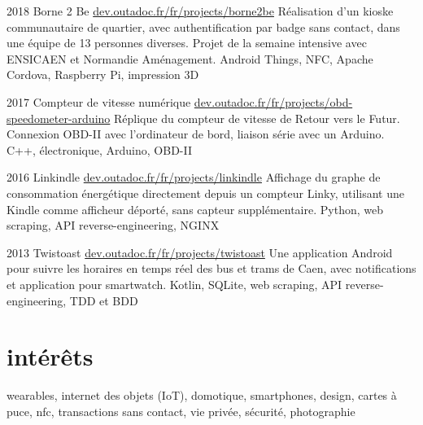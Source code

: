 \documentclass[]{friggeri-cv}
\begin{document}
\begin{entrylist}
	\entry
	{2018}
	{Borne 2 Be}
	{\href{https://dev.outadoc.fr/fr/projects/borne2be}{dev.outadoc.fr/fr/projects/borne2be}}
	{Réalisation d'un kioske communautaire de quartier, avec authentification par badge sans contact, dans une équipe de 13 personnes diverses. Projet de la semaine intensive avec ENSICAEN et Normandie Aménagement.}
	{Android Things, NFC, Apache Cordova, Raspberry Pi, impression 3D}
	
	\entry
	{2017}
	{Compteur de vitesse numérique}
	{\href{https://dev.outadoc.fr/fr/projects/obd-speedometer-arduino}{dev.outadoc.fr/fr/projects/obd-speedometer-arduino}}
	{Réplique du compteur de vitesse de Retour vers le Futur. Connexion OBD-II avec l'ordinateur de bord, liaison série avec un Arduino.}
	{C++, électronique, Arduino, OBD-II}
	
	\entry
	{2016}
	{Linkindle}
	{\href{https://dev.outadoc.fr/fr/projects/linkindle}{dev.outadoc.fr/fr/projects/linkindle}}
	{Affichage du graphe de consommation énergétique directement depuis un compteur Linky, utilisant une Kindle comme afficheur déporté, sans capteur supplémentaire.}
	{Python, web scraping, API reverse-engineering, NGINX}
    
    \entry
    {2013}
    {Twistoast}
    {\href{https://dev.outadoc.fr/fr/projects/twistoast}{dev.outadoc.fr/fr/projects/twistoast}}
    {Une application Android pour suivre les horaires en temps réel des bus et trams de Caen, avec notifications et application pour smartwatch.}
    {Kotlin, SQLite, web scraping, API reverse-engineering, TDD et BDD}
\end{entrylist}

\section{intérêts}

wearables, internet des objets (IoT), domotique, smartphones, design, cartes à puce, nfc, transactions sans contact, vie privée, sécurité, photographie
\end{document}
